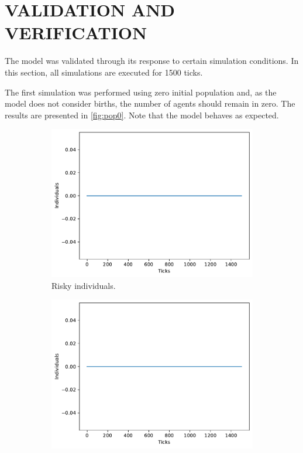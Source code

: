\section{VALIDATION AND VERIFICATION}\label{sec:valid}
The model was validated through its response to certain simulation conditions. In this section, all simulations are executed for 1500 ticks.

The first simulation was performed using zero initial population and, as the model does not consider births, the number of agents should remain in zero.  The results are presented in \cref{fig:pop0}. Note that the model behaves as expected.

\begin{figure}[H]
        \centering
        \begin{subfigure}[b]{0.3\columnwidth}
            \centering
            \includegraphics[width=1\columnwidth]{files/population-0-risk.pdf}
            \caption{Risky individuals.}
            \label{subfig:control}
        \end{subfigure} 
        \begin{subfigure}[b]{0.3\columnwidth}
            \centering 
            \includegraphics[width=1\columnwidth]{files/population-0-healthy.pdf}

\end{subfigure}
\end{figure}

